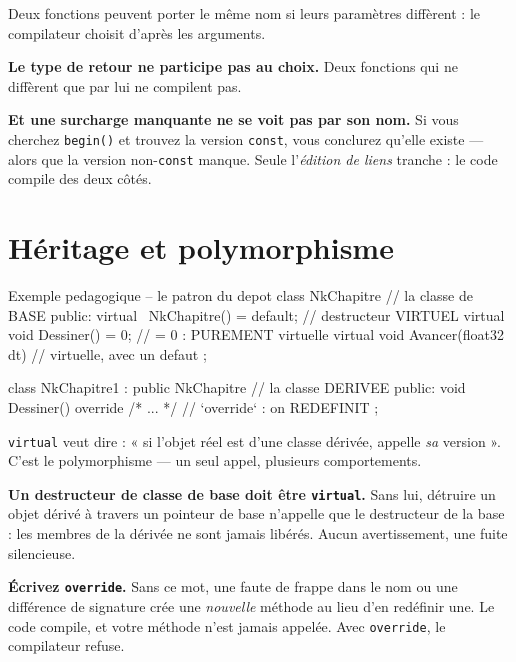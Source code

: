 Deux fonctions peuvent porter le même nom si leurs paramètres diffèrent : le
compilateur choisit d'après les arguments.

\begin{nkpiege}
\textbf{Le type de retour ne participe pas au choix.} Deux fonctions qui ne
diffèrent que par lui ne compilent pas.

\textbf{Et une surcharge manquante ne se voit pas par son nom.} Si vous cherchez
\texttt{begin()} et trouvez la version \texttt{const}, vous conclurez qu'elle
existe --- alors que la version non-\texttt{const} manque. Seule l'\emph{édition
de liens} tranche : le code compile des deux côtés.
\end{nkpiege}

\section{Héritage et polymorphisme}

\begin{nkcode}{Exemple pedagogique -- le patron du depot}
class NkChapitre {                       // la classe de BASE
    public:
        virtual ~NkChapitre() = default;         // destructeur VIRTUEL
        virtual void Dessiner() = 0;             // = 0 : PUREMENT virtuelle
        virtual void Avancer(float32 dt) { }     // virtuelle, avec un defaut
};

class NkChapitre1 : public NkChapitre {  // la classe DERIVEE
    public:
        void Dessiner() override { /* ... */ }   // `override` : on REDEFINIT
};
\end{nkcode}

\texttt{virtual} veut dire : « si l'objet réel est d'une classe dérivée, appelle
\emph{sa} version ». C'est le polymorphisme --- un seul appel, plusieurs
comportements.

\begin{nkpiege}
\textbf{Un destructeur de classe de base doit être \texttt{virtual}.} Sans lui,
détruire un objet dérivé à travers un pointeur de base n'appelle que le
destructeur de la base : les membres de la dérivée ne sont jamais libérés. Aucun
avertissement, une fuite silencieuse.

\textbf{Écrivez \texttt{override}.} Sans ce mot, une faute de frappe dans le nom
ou une différence de signature crée une \emph{nouvelle} méthode au lieu d'en
redéfinir une. Le code compile, et votre méthode n'est jamais appelée. Avec
\texttt{override}, le compilateur refuse.
\end{nkpiege}

